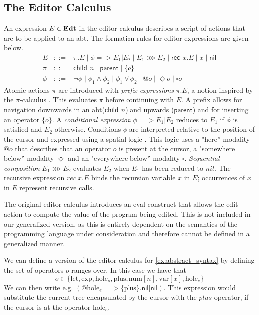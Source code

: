\documentclass[sigplan]{acmart}
\newcommand{\abt}{\textsf{abt}\xspace}
\newcommand{\ec}[1]{\ensuremath{\textsf{#1}}\xspace}
\newcommand{\rec}{\ec{rec}\,}
\newcommand{\chld}{\ec{child}\,}
\newcommand{\parnt}{\ec{parent}}
\newcommand{\nil}{\ec{nil}}
\begin{document}
\subsection{The Editor Calculus}
An expression $E \in \textbf{Edt}$ in the editor calculus describes a script
of actions that are to be applied to an \abt. The formation rules for
editor expressions are given below.
%
\begin{align*}
  E & ::= & \pi.E  \mid  \phi => E_1|E_2  \mid  E_1 \ggg E_2  \mid  \rec  \ x.E  \mid  x  \mid  \nil  \\
    \pi & ::= & \chld  \ n  \mid  \parnt   \mid  \{o\} \\
    \phi & ::= & \neg\phi  \mid  \phi_1 \wedge \phi_2  \mid  \phi_1 \vee \phi_2  \mid  @o  \mid  \Diamond o  \mid  \square o
\end{align*}
%
Atomic actions $\pi$ are introduced with \emph{prefix expressions}
$\pi.E$, a notion inspired by the $\pi$-calculus
\cite{picalculus}. This evaluates $\pi$ before continuing with $E$. A
prefix allows for navigation downwards in an \abt ($\chld \ n$) and
upwards ($\parnt$) and for inserting an operator $\{ o \}$. A
\emph{conditional expression} $\phi => E_1|E_2$ reduces to $E_1$ if
$\phi$ is satisfied and $E_2$ otherwise. Conditions $\phi$ are
interpreted relative to the position of the cursor and expressed using
a spatial logic \cite{CAIRES2003194}. This logic uses a "here''
modality $@o$ that describes that an operator $o$ is present at the
cursor, a "somewhere below'' modality $\Diamond$ and an "everywhere
below'' modality $\square$. \emph{Sequential composition}
$E_1 \ggg E_2$ evaluates $E_2$ when $E_1$ has been reduced to
$nil$. The recursive expression $rec \ x.E$ binds the recursion
variable $x$ in $E$; occurrences of $x$ in $E$ represent recursive
calls.

The original editor calculus \cite{type_safe_structure_editor}
introduces an \textsf{eval} construct that allows the edit action to
compute the value of the program being edited. This is not included in
our generalized version, as this is entirely dependent on the
semantics of the programming language under consideration and
therefore cannot be defined in a generalized manner.

\begin{example}\label{ex:editor_calculus}
    We can define a version of the editor calculus for
    \cref{ex:abstract_syntax} by defining the set of operators $o$ ranges over. In this case we have that
    \begin{equation*}
        o \in \{ \text{let}, \text{exp}, \text{hole}_s, \text{plus}, \text{num}[n], \text{var}[x], \text{hole}_e \}
    \end{equation*}
    We can then write e.g. $(@\text{hole}_e =>
    \{\text{plus}\}.\nil |\nil )$. This expression would
    substitute the current tree encapsulated by the cursor with the
    $plus$ operator, if the cursor is at the operator
    $\text{hole}_e$.
\end{example}
\end{document}
